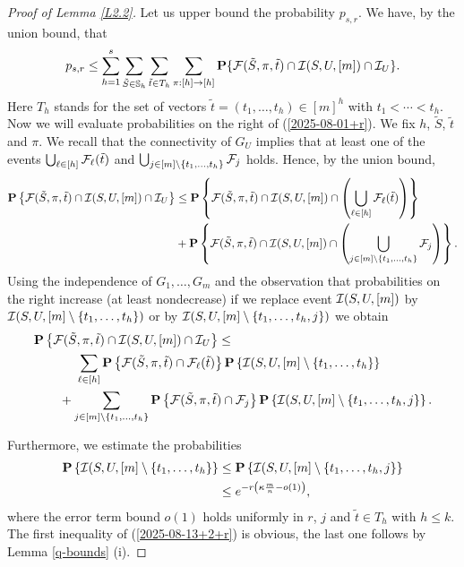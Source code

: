 \documentclass[11pt, a4paper]{article}
\newcommand{\PP}{{\bf{P}}}
\begin{document}
\begin{proof}[Proof of Lemma \ref{L2.2}]
\smallskip

Let us upper bound the probability  $p_{s,r}$. We have, by the union bound, that
\begin{equation}
\label{2025-08-01+r}
p_{s,r}
\le
\sum_{h=1}^s
\sum_{{\tilde S}\in {\mathbb S}_h}
\sum_{{\tilde t}\in T_h}
\sum_{\pi:[h]\to[h]}
\PP\{{\cal F}({\tilde S}, \pi, {\tilde t})\cap {\cal I}(S,U,[m])
\cap
{\cal I}_U\}.
\end{equation}
Here $T_h$ stands for the set of vectors ${\tilde t}=(t_1,\dots, t_h)\in[m]^h$ with
$t_1<\cdots<t_h$.
%
Now we will
evaluate probabilities on the right of 
(\ref{2025-08-01+r}). 
We fix $h$, ${\tilde S}$, ${\tilde t}$ and $\pi$.
We recall that the connectivity of $G_U$ implies that at least one of the events 
$\bigcup_{\ell\in[h]}{\cal F}_{\ell}({\tilde t})$ 
and 
$\bigcup_{j\in[m]\setminus\{t_1,\dots, t_h\}}
{\cal F}_j$ holds. Hence, by the union bound,
\begin{align*}
\PP\left\{
{\cal F}
({\tilde S}, \pi, {\tilde t})
\cap 
{\cal I}(S,U,[m])
\cap
{\cal I}_U
\right\}
&
\le
\PP\left\{
{\cal F}({\tilde S}, 
\pi, 
{\tilde t})
\cap 
{\cal I}(S,U,[m])
\cap
\left(
\bigcup_{\ell\in[h]}
{\cal F}_{\ell}({\tilde t})
\right)
\right\}
\\
&
+
\PP\left\{
{\cal F}({\tilde S}, \pi, {\tilde t})\cap {\cal I}(S,U,[m]) 
\cap
\left(
\bigcup_{j\in[m]\setminus\{t_1,\dots, t_h\}}
{\cal F}_j
\right)\right\}.
\end{align*}
Using  the independence of $G_1,\dots, G_m$  and the observation that  probabilities on the right increase (at least nondecrease) if 
we replace event ${\cal I}(S,U,[m])$ 
by 
${\cal I}(S,U,[m]\setminus\{t_1,\dots, t_h\})$ 
or by ${\cal I}(S,U,[m]\setminus\{t_1,\dots, t_h, j\})$
we 
obtain
\begin{align}
\label{2025-08-13+1+r}
&\PP\left\{{\cal F}({\tilde S}, \pi, {\tilde t})\cap {\cal I}(S,U,[m])
\cap
{\cal I}_U
\right\}
\le
\\
\nonumber
&
\qquad
\
\quad
\sum_{\ell\in [h]}\PP\left\{{\cal F}({\tilde S}, \pi, {\tilde t})
\cap
{\cal F}_{\ell}({\tilde t})\right\}
\PP\left\{{\cal I}(S,U,[m]\setminus\{t_1,\dots, t_h\}\right\}
\\
\nonumber
&
\qquad
+
\sum_{j\in[m]\setminus\{t_1,\dots, t_h\}}
\PP\left\{
{\cal F}({\tilde S}, \pi, {\tilde t})\cap{\cal F}_j\right\}
\PP\left\{ {\cal I}(S,U,[m]\setminus\{t_1,\dots, t_h,j\}\right\}.
\end{align}


Furthermore,  we estimate the probabilities
\begin{align}
\label{2025-08-13+2+r}
\PP\left\{{\cal I}(S,U,[m]\setminus\{t_1,\dots, t_h\}\right\}
&
\le
\PP\left\{ {\cal I}(S,U,[m]\setminus\{t_1,\dots, t_h,j\}\right\}
\\
\nonumber
&
\le
e^{-r\left(\kappa\frac{m}{n}-o(1)\right)},
\end{align}
where the error term  bound $o(1)$ holds uniformly in $r$, $j$ and
${\tilde t}\in T_h$ with $h\le k$.
The first inequality of (\ref{2025-08-13+2+r}) is obvious, the last one follows by Lemma \ref{q-bounds} (i).
 

\end{proof}
\end{document}
